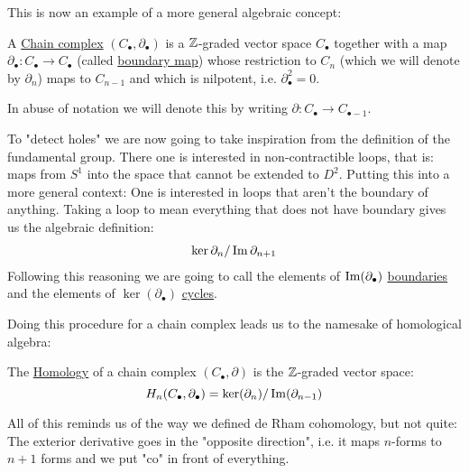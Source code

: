 This is now an example of a more general algebraic concept:

\begin{definition}
	A \underline{Chain complex} $(C_\bullet, \partial_\bullet)$ is a $\mathbb{Z}$-graded
	vector space $C_\bullet$ together with a map
	$\partial_\bullet: C_\bullet \to C_\bullet$ (called \underline{boundary map})
	whose restriction to $C_n$ (which we will denote by $\partial_n$) maps to
	$C_{n - 1}$ and which is nilpotent, i.e. $\partial_\bullet^2 = 0$.
\end{definition}
In abuse of notation we will denote this by writing
$\partial: C_\bullet \to C_{\bullet - 1}$.

To "detect holes" we are now going to take inspiration from the definition of
the fundamental group. There one is interested in non-contractible loops, that
is: maps from $S^1$ into the space that cannot be extended to $D^2$. Putting
this into a more general context: One is interested in loops that aren't the boundary
of anything. Taking a loop to mean everything that does not have boundary gives us
the algebraic definition:
\begin{align*}
	\ker \partial_n / \operatorname{Im} \partial_{n + 1}
\end{align*}
Following this reasoning we are going to call the elements of $\operatorname{Im}(\partial_\bullet)$
\underline{boundaries} and the elements of $\ker(\partial_\bullet)$ \underline{cycles}.

Doing this procedure for a chain complex leads us to the namesake of homological algebra:
\begin{definition}
The \underline{Homology} of a chain complex $(C_\bullet, \partial)$ is the
$\mathbb{Z}$-graded vector space:
\[	
	H_n(C_\bullet, \partial_\bullet) = \ker(\partial_n)/\operatorname{Im}(\partial_{n - 1})
\]
\end{definition}

All of this reminds us of the way we defined de Rham cohomology, but not quite:
The exterior derivative goes in the "opposite direction", i.e. it maps $n$-forms
to $n+1$ forms and we put "co" in front of everything.

